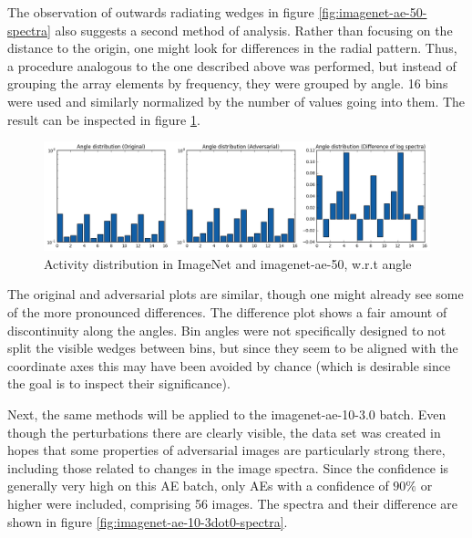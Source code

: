 \documentclass[11pt, a4paper]{article}
\begin{document}
The observation of outwards radiating wedges in figure \ref{fig:imagenet-ae-50-spectra} also suggests a second method of analysis. Rather than focusing on the distance to the origin, one might look for differences in the radial pattern. Thus, a procedure analogous to the one described above was performed, but instead of grouping the array elements by frequency, they were grouped by angle. 16 bins were used and similarly normalized by the number of values going into them. The result can be inspected in figure \ref{fig:imagenet-ae-50-angle}.

\begin{figure}[h!tb]
	\centering
	\includegraphics[width=\textwidth]{images/spectra/imagenet-ae-50-minconfidence-0dot5-maxorig-20000-angle-16-bins.png}
	\caption{Activity distribution in ImageNet and imagenet-ae-50, w.r.t angle}
	\label{fig:imagenet-ae-50-angle}
\end{figure}

The original and adversarial plots are similar, though one might already see some of the more pronounced differences. The difference plot shows a fair amount of discontinuity along the angles. Bin angles were not specifically designed to not split the visible wedges between bins, but since they seem to be aligned with the coordinate axes this may have been avoided by chance (which is desirable since the goal is to inspect their significance).


Next, the same methods will be applied to the imagenet-ae-10-3.0 batch. Even though the perturbations there are clearly visible, the data set was created in hopes that some properties of adversarial images are particularly strong there, including those related to changes in the image spectra. Since the confidence is generally very high on this AE batch, only AEs with a confidence of $90\%$ or higher were included, comprising 56 images. The spectra and their difference are shown in figure \ref{fig:imagenet-ae-10-3dot0-spectra}.
\end{document}
